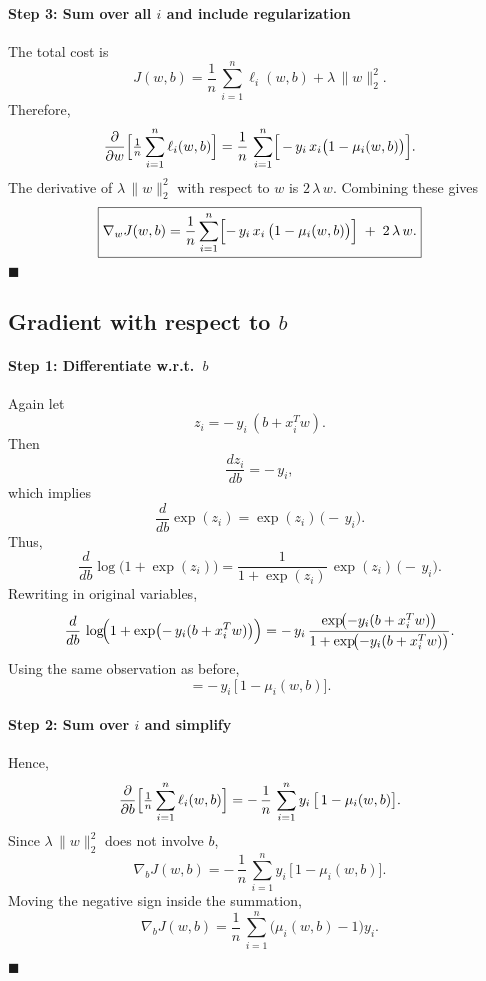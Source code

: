 \documentclass{article}
\begin{document}
\paragraph{Step 3: Sum over all \(i\) and include regularization}
The total cost is
\[
J(w,b)
= \frac{1}{n}\,\sum_{i=1}^n \ell_i(w,b)
+ \lambda\,\|w\|_2^2.
\]
Therefore,
\[
\frac{\partial}{\partial w}
\Bigl[\tfrac{1}{n}\sum_{i=1}^n \ell_i(w,b)\Bigr]
= \frac{1}{n}\,\sum_{i=1}^n
\Bigl[\,-\,y_i \,x_i \bigl(1 - \mu_i(w,b)\bigr)\Bigr].
\]
The derivative of \(\lambda\,\|w\|_2^2\) with respect to \(w\) is \(2\,\lambda\,w\). Combining these gives
\[
\boxed{
\nabla_w J(w,b)
= \frac{1}{n}\sum_{i=1}^n
\Bigl[-\,y_i\,x_i\,\bigl(1 - \mu_i(w,b)\bigr)\Bigr]
\;+\; 2\,\lambda\,w.
}
\]
\hfill\(\blacksquare\)

\subsection*{Gradient with respect to \(b\)}

\paragraph{Step 1: Differentiate w.r.t.\ \(b\)}
Again let 
\[
z_i = -\,y_i\,(b + x_i^T w).
\]
Then 
\[
\frac{dz_i}{db}
= -\,y_i,
\]
which implies
\[
\frac{d}{db} \exp(z_i)
= \exp(z_i)\,\bigl(-\,y_i\bigr).
\]
Thus,
\[
\frac{d}{db}
\log\bigl(1 + \exp(z_i)\bigr)
= \frac{1}{1 + \exp(z_i)} \,\exp(z_i)\,\bigl(-\,y_i\bigr).
\]
Rewriting in original variables,
\[
\frac{d}{db}\,\log\!\Bigl(1 + \exp\bigl(-\,y_i(b + x_i^T w)\bigr)\Bigr)
= -\,y_i \,\frac{\exp\!\bigl(-y_i(b + x_i^T w)\bigr)}{1 + \exp\!\bigl(-y_i(b + x_i^T w)\bigr)}.
\]
Using the same observation as before,
\[
= -\,y_i\,\bigl[\,1 - \mu_i(w,b)\bigr].
\]

\paragraph{Step 2: Sum over \(i\) and simplify}
Hence,
\[
\frac{\partial}{\partial b}\Bigl[\tfrac{1}{n}\sum_{i=1}^n \ell_i(w,b)\Bigr]
= -\,\frac{1}{n}\,\sum_{i=1}^n
y_i\,\bigl[\,1 - \mu_i(w,b)\bigr].
\]
Since \(\lambda\,\|w\|_2^2\) does not involve \(b\),
\[
\nabla_b J(w,b)
= -\,\frac{1}{n}\,\sum_{i=1}^n
y_i\,\bigl[\,1 - \mu_i(w,b)\bigr].
\]
Moving the negative sign inside the summation,
\[
\boxed{
\nabla_b J(w,b)
= \frac{1}{n}\,\sum_{i=1}^n
\bigl(\mu_i(w,b) - 1\bigr) y_i.
}
\]

\hfill\(\blacksquare\)
\end{document}

